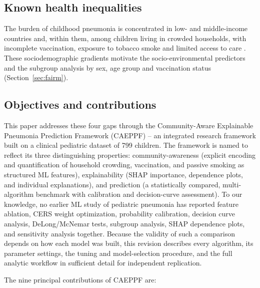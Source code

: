 \documentclass[a4paper,fleqn]{cas-dc}
\begin{document}
\subsection{Known health inequalities}
\label{sec:ineq}
 The burden of childhood pneumonia is concentrated in low- and middle-income countries and, within them, among children living in crowded households, with incomplete vaccination, exposure to tobacco smoke and limited access to care \cite{r1,r5,r8,r13}. These sociodemographic gradients motivate the socio-environmental predictors and the subgroup analysis by sex, age group and vaccination status (Section~\ref{sec:fairm}).

\subsection{Objectives and contributions}
\label{sec:obj}

This paper addresses these four gaps through the Community-Aware Explainable Pneumonia Prediction Framework (CAEPPF) -- an integrated research framework built on a clinical pediatric dataset of 799 children. The framework is named to reflect its three distinguishing properties: community-awareness (explicit encoding and quantification of household crowding, vaccination, and passive smoking as structured ML features), explainability (SHAP importance, dependence plots, and individual explanations), and prediction (a statistically compared, multi-algorithm benchmark with calibration and decision-curve assessment). To our knowledge, no earlier ML study of pediatric pneumonia has reported feature ablation, CERS weight optimization, probability calibration, decision curve analysis, DeLong/McNemar tests, subgroup analysis, SHAP dependence plots, and sensitivity analysis together. Because the validity of such a comparison depends on how each model was built, this revision describes every algorithm, its parameter settings, the tuning and model-selection procedure, and the full analytic workflow in sufficient detail for independent replication.

The nine principal contributions of CAEPPF are:
\end{document}
